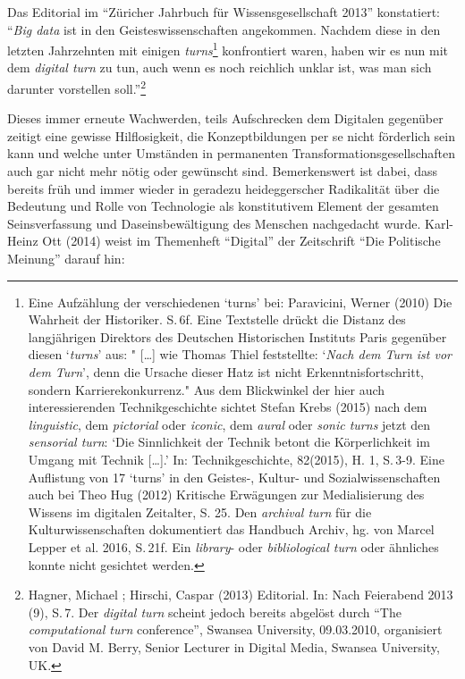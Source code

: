 \documentclass[a4paper,
fontsize=11pt,
oneside,
numbers=noperiodatend,
parskip=half-,
bibliography=totoc,
final
]{scrartcl}
\begin{document}
Das Editorial im \enquote{Züricher Jahrbuch für Wissensgesellschaft
2013} konstatiert: \enquote{\emph{Big data} ist in den
Geisteswissenschaften angekommen. Nachdem diese in den letzten
Jahrzehnten mit einigen \emph{turns}\footnote{Eine Aufzählung der
  verschiedenen \enquote{turns} bei: Paravicini, Werner (2010) Die
  Wahrheit der Historiker. S.\,6f. Eine Textstelle drückt die Distanz des
  langjährigen Direktors des Deutschen Historischen Instituts Paris
  gegenüber diesen \enquote{\emph{turns}} aus: " {[}\ldots{}{]} wie
  Thomas Thiel feststellte: \enquote{\emph{Nach dem Turn ist vor dem
  Turn}}, denn die Ursache dieser Hatz ist nicht Erkenntnisfortschritt,
  sondern Karrierekonkurrenz." Aus dem Blickwinkel der hier auch
  interessierenden Technikgeschichte sichtet Stefan Krebs (2015) nach
  dem \emph{linguistic}, dem \emph{pictorial} oder \emph{iconic}, dem
  \emph{aural} oder \emph{sonic turns} jetzt den \emph{sensorial turn}:
  \enquote{Die Sinnlichkeit der Technik betont die Körperlichkeit im
  Umgang mit Technik {[}\ldots{}{]}.} In: Technikgeschichte, 82(2015),
  H. 1, S.\,3-9. Eine Auflistung von 17 \enquote{turns} in den Geistes-,
  Kultur- und Sozialwissenschaften auch bei Theo Hug (2012) Kritische
  Erwägungen zur Medialisierung des Wissens im digitalen Zeitalter, S.
  25. Den \emph{archival turn} für die Kulturwissenschaften dokumentiert
  das Handbuch Archiv, hg. von Marcel Lepper et al. 2016, S.\,21f. Ein
  \emph{library}- oder \emph{bibliological turn} oder ähnliches konnte
  nicht gesichtet werden.} konfrontiert waren, haben wir es nun mit dem
\emph{digital turn} zu tun, auch wenn es noch reichlich unklar ist, was
man sich darunter vorstellen soll.}\footnote{Hagner, Michael ; Hirschi,
  Caspar (2013) Editorial. In: Nach Feierabend 2013 (9), S.\,7. Der
  \emph{digital turn} scheint jedoch bereits abgelöst durch \enquote{The
  \emph{computational turn} conference}, Swansea University, 09.03.2010,
  organisiert von David M. Berry, Senior Lecturer in Digital Media,
  Swansea University, UK.}

Dieses immer erneute Wachwerden, teils Aufschrecken dem Digitalen
gegenüber zeitigt eine gewisse Hilflosigkeit, die Konzeptbildungen per
se nicht förderlich sein kann und welche unter Umständen in permanenten
Transformationsgesellschaften auch gar nicht mehr nötig oder gewünscht
sind. Bemerkenswert ist dabei, dass bereits früh und immer wieder in
geradezu heideggerscher Radikalität über die Bedeutung und Rolle von
Technologie als konstitutivem Element der gesamten Seinsverfassung und
Daseinsbewältigung des Menschen nachgedacht wurde. Karl-Heinz Ott (2014)
weist im Themenheft \enquote{Digital} der Zeitschrift \enquote{Die
Politische Meinung} darauf hin:
\end{document}

